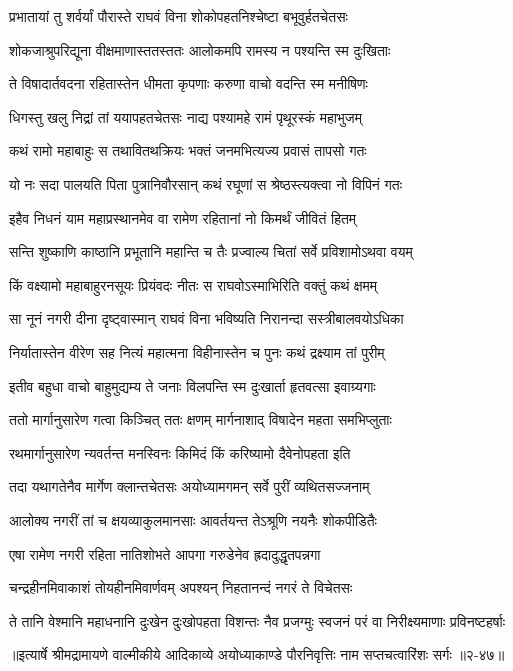
\twolineshloka
{प्रभातायां तु शर्वर्यां पौरास्ते राघवं विना}
{शोकोपहतनिश्चेष्टा बभूवुर्हतचेतसः} %

\twolineshloka
{शोकजाश्रुपरिद्यूना वीक्षमाणास्ततस्ततः}
{आलोकमपि रामस्य न पश्यन्ति स्म दुःखिताः} %

\twolineshloka
{ते विषादार्तवदना रहितास्तेन धीमता}
{कृपणाः करुणा वाचो वदन्ति स्म मनीषिणः} %

\twolineshloka
{धिगस्तु खलु निद्रां तां ययापहतचेतसः}
{नाद्य पश्यामहे रामं पृथूरस्कं महाभुजम्} %

\twolineshloka
{कथं रामो महाबाहुः स तथावितथक्रियः}
{भक्तं जनमभित्यज्य प्रवासं तापसो गतः} %

\twolineshloka
{यो नः सदा पालयति पिता पुत्रानिवौरसान्}
{कथं रघूणां स श्रेष्ठस्त्यक्त्वा नो विपिनं गतः} %

\twolineshloka
{इहैव निधनं याम महाप्रस्थानमेव वा}
{रामेण रहितानां नो किमर्थं जीवितं हितम्} %

\twolineshloka
{सन्ति शुष्काणि काष्ठानि प्रभूतानि महान्ति च}
{तैः प्रज्वाल्य चितां सर्वे प्रविशामोऽथवा वयम्} %

\twolineshloka
{किं वक्ष्यामो महाबाहुरनसूयः प्रियंवदः}
{नीतः स राघवोऽस्माभिरिति वक्तुं कथं क्षमम्} %

\twolineshloka
{सा नूनं नगरी दीना दृष्ट्वास्मान् राघवं विना}
{भविष्यति निरानन्दा सस्त्रीबालवयोऽधिका} %

\twolineshloka
{निर्यातास्तेन वीरेण सह नित्यं महात्मना}
{विहीनास्तेन च पुनः कथं द्रक्ष्याम तां पुरीम्} %

\twolineshloka
{इतीव बहुधा वाचो बाहुमुद्यम्य ते जनाः}
{विलपन्ति स्म दुःखार्ता हृतवत्सा इवाग्र्यगाः} %

\twolineshloka
{ततो मार्गानुसारेण गत्वा किञ्चित् ततः क्षणम्}
{मार्गनाशाद् विषादेन महता समभिप्लुताः} %

\twolineshloka
{रथमार्गानुसारेण न्यवर्तन्त मनस्विनः}
{किमिदं किं करिष्यामो दैवेनोपहता इति} %

\twolineshloka
{तदा यथागतेनैव मार्गेण क्लान्तचेतसः}
{अयोध्यामगमन् सर्वे पुरीं व्यथितसज्जनाम्} %

\twolineshloka
{आलोक्य नगरीं तां च क्षयव्याकुलमानसाः}
{आवर्तयन्त तेऽश्रूणि नयनैः शोकपीडितैः} %

\twolineshloka
{एषा रामेण नगरी रहिता नातिशोभते}
{आपगा गरुडेनेव ह्रदादुद्धृतपन्नगा} %

\twolineshloka
{चन्द्रहीनमिवाकाशं तोयहीनमिवार्णवम्}
{अपश्यन् निहतानन्दं नगरं ते विचेतसः} %

\twolineshloka
{ते तानि वेश्मानि महाधनानि दुःखेन दुःखोपहता विशन्तः}
{नैव प्रजग्मुः स्वजनं परं वा निरीक्ष्यमाणाः प्रविनष्टहर्षाः} %


॥इत्यार्षे श्रीमद्रामायणे वाल्मीकीये आदिकाव्ये अयोध्याकाण्डे पौरनिवृत्तिः नाम सप्तचत्वारिंशः सर्गः ॥२-४७॥
